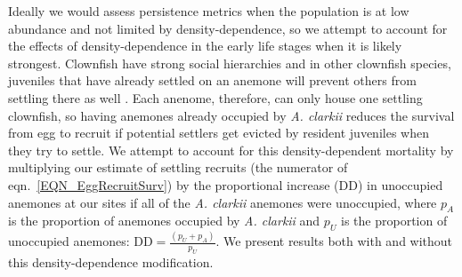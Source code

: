 \documentclass[12pt, oneside]{article}   	%
\begin{document}
Ideally we would assess persistence metrics when the population is at low abundance and not limited by density-dependence, so we attempt to account for the effects of density-dependence in the early life stages when it is likely strongest. Clownfish have strong social hierarchies and in other clownfish species, juveniles that have already settled on an anemone will prevent others from settling there as well \citep{buston2003forcible}. Each anenome, therefore, can only house one settling clownfish, so having anemones already occupied by \textit{A. clarkii} reduces the survival from egg to recruit if potential settlers get evicted by resident juveniles when they try to settle. We attempt to account for this density-dependent mortality by multiplying our estimate of settling recruits (the numerator of eqn.\ \ref{EQN_EggRecruitSurv}) by the proportional increase ($\text{DD}$) in unoccupied anemones at our sites if all of the \textit{A. clarkii} anemones were unoccupied, where $p_A$ is the proportion of anemones occupied by \textit{A. clarkii} and $p_U$ is the proportion of unoccupied anemones: $\text{DD} = \frac{(p_U + p_A)}{p_U}$. We present results both with and without this density-dependence modification.



\end{document}
